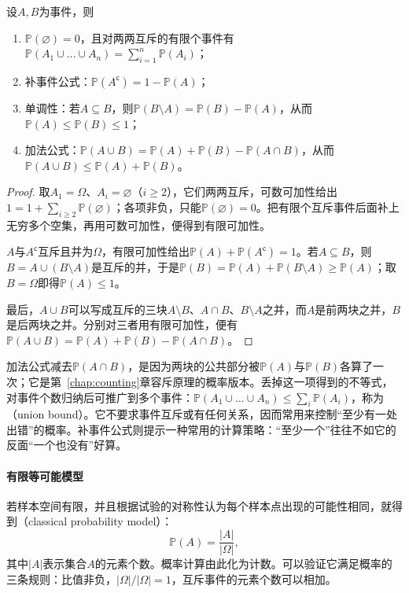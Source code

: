 \begin{theorem}[概率的基本性质]
\label{thm:prob-basic-properties}
设$A,B$为事件，则
\begin{enumerate}
  \item $\mathbb{P}(\varnothing)=0$，且对两两互斥的有限个事件有$\mathbb{P}(A_1\cup\dots\cup A_n)=\sum_{i=1}^n\mathbb{P}(A_i)$；
  \item 补事件公式：$\mathbb{P}(A^{\mathsf c})=1-\mathbb{P}(A)$；
  \item 单调性：若$A\subseteq B$，则$\mathbb{P}(B\setminus A)=\mathbb{P}(B)-\mathbb{P}(A)$，从而$\mathbb{P}(A)\leq\mathbb{P}(B)\leq1$；
  \item 加法公式：$\mathbb{P}(A\cup B)=\mathbb{P}(A)+\mathbb{P}(B)-\mathbb{P}(A\cap B)$，从而$\mathbb{P}(A\cup B)\leq\mathbb{P}(A)+\mathbb{P}(B)$。
\end{enumerate}
\end{theorem}
\begin{proof}
取$A_1=\Omega$、$A_i=\varnothing$（$i\geq2$），它们两两互斥，可数可加性给出$1=1+\sum_{i\geq2}\mathbb{P}(\varnothing)$；各项非负，只能$\mathbb{P}(\varnothing)=0$。把有限个互斥事件后面补上无穷多个空集，再用可数可加性，便得到有限可加性。

$A$与$A^{\mathsf c}$互斥且并为$\Omega$，有限可加性给出$\mathbb{P}(A)+\mathbb{P}(A^{\mathsf c})=1$。若$A\subseteq B$，则$B=A\cup(B\setminus A)$是互斥的并，于是$\mathbb{P}(B)=\mathbb{P}(A)+\mathbb{P}(B\setminus A)\geq\mathbb{P}(A)$；取$B=\Omega$即得$\mathbb{P}(A)\leq1$。

最后，$A\cup B$可以写成互斥的三块$A\setminus B$、$A\cap B$、$B\setminus A$之并，而$A$是前两块之并，$B$是后两块之并。分别对三者用有限可加性，便有$\mathbb{P}(A\cup B)=\mathbb{P}(A)+\mathbb{P}(B)-\mathbb{P}(A\cap B)$。
\end{proof}

加法公式减去$\mathbb{P}(A\cap B)$，是因为两块的公共部分被$\mathbb{P}(A)$与$\mathbb{P}(B)$各算了一次；它是第~\ref{chap:counting}章容斥原理的概率版本。丢掉这一项得到的不等式，对事件个数归纳后可推广到多个事件：$\mathbb{P}(A_1\cup\dots\cup A_n)\leq\sum_i\mathbb{P}(A_i)$，称为（union bound）。它不要求事件互斥或有任何关系，因而常用来控制“至少有一处出错”的概率。补事件公式则提示一种常用的计算策略：“至少一个”往往不如它的反面“一个也没有”好算。

\paragraph{有限等可能模型}
若样本空间有限，并且根据试验的对称性认为每个样本点出现的可能性相同，就得到（classical probability model）：
\[
  \mathbb{P}(A)=\frac{|A|}{|\Omega|},
\]
其中$|A|$表示集合$A$的元素个数。概率计算由此化为计数。可以验证它满足概率的三条规则：比值非负，$|\Omega|/|\Omega|=1$，互斥事件的元素个数可以相加。

